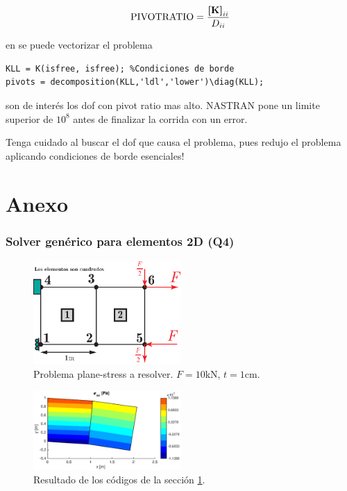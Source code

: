 \[
\text{PIVOTRATIO} = \frac{\boldsymbol{[}\mathbf{K} \boldsymbol{]}_{ii}}{D_{ii}}
\]

en \Matlab{} se puede vectorizar el problema
\begin{lstlisting}[caption = {Rutina MAXPIVOT de NASTRAN.}]
KLL = K(isfree, isfree); %Condiciones de borde
pivots = decomposition(KLL,'ldl','lower')\diag(KLL);
\end{lstlisting}
son de interés los dof con pivot ratio mas alto. NASTRAN pone un limite superior de $10^8$ antes de finalizar la corrida con un error.

Tenga cuidado al buscar el dof que causa el problema, pues redujo el problema aplicando condiciones de borde esenciales! 



\part{Anexo}

\section{Solver genérico para elementos 2D (Q4)} \label{sec:q4codigo}

\begin{figure}[ht!]
    \centering
    \includegraphics[width=0.5\textwidth]{fig/q4domain.eps}
    \caption{Problema plane-stress a resolver. $F=10$kN, $t=1$cm.}
\end{figure}



\clearpage


\begin{figure}[ht!]
    \centering
    \includegraphics[width=0.5\textwidth]{code/q4domain.eps}
    \vspace{-1cm}
    \caption{Resultado de los códigos de la sección \ref{sec:q4codigo}. }
\end{figure}

